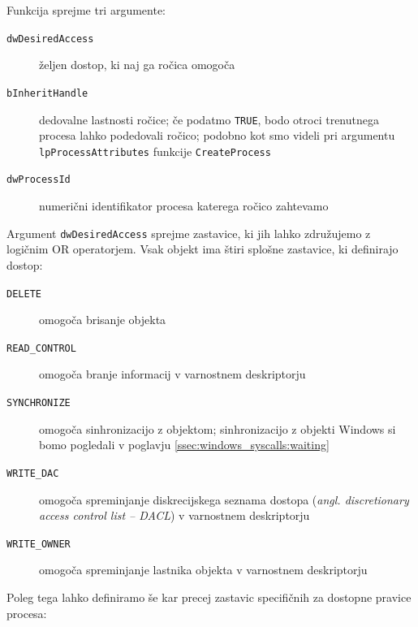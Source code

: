 \documentclass[a4paper,12pt,openright]{book}
\begin{document}
Funkcija sprejme tri argumente:
\begin{description}
	\item[\texttt{dwDesiredAccess}] željen dostop, ki naj ga ročica omogoča
	\item[\texttt{bInheritHandle}] dedovalne lastnosti ročice; če podatmo \texttt{TRUE}, bodo otroci trenutnega procesa lahko podedovali ročico; podobno kot smo videli pri argumentu \texttt{lpProcessAttributes} funkcije \texttt{CreateProcess}
	\item[\texttt{dwProcessId}] numerični identifikator procesa katerega ročico zahtevamo
\end{description}

Argument \texttt{dwDesiredAccess} sprejme zastavice, ki jih lahko združujemo z logičnim OR operatorjem.
Vsak objekt ima štiri splošne zastavice, ki definirajo dostop:
\begin{description}
	\item[\texttt{DELETE}] omogoča brisanje objekta
	\item[\texttt{READ\_CONTROL}] omogoča branje informacij v varnostnem deskriptorju
	\item[\texttt{SYNCHRONIZE}] omogoča sinhronizacijo z objektom; sinhronizacijo z objekti Windows si bomo pogledali v poglavju \ref{ssec:windows_syscalls:waiting}
	\item[\texttt{WRITE\_DAC}] omogoča spreminjanje diskrecijskega seznama dostopa (\textit{angl. discretionary access control list -- DACL}) v varnostnem deskriptorju
	\item[\texttt{WRITE\_OWNER}] omogoča spreminjanje lastnika objekta v varnostnem deskriptorju
\end{description}
Poleg tega lahko definiramo še kar precej zastavic specifičnih za dostopne pravice procesa:
\end{document}
